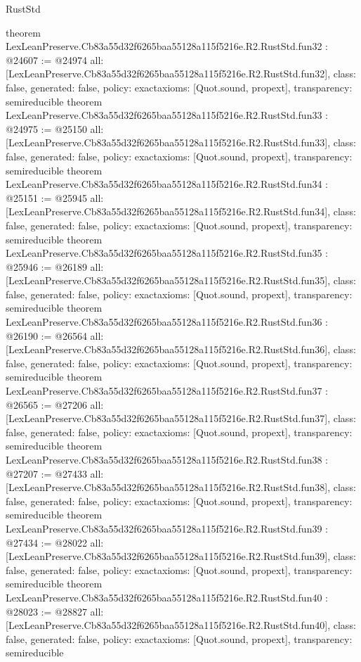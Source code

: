 \begin{lexlean}{RustStd}
\begin{coremodule}
{}
theorem LexLeanPreserve.Cb83a55d32f6265baa55128a115f5216e.R2.RustStd.fun32 : @24607 := @24974 {
  all: [LexLeanPreserve.Cb83a55d32f6265baa55128a115f5216e.R2.RustStd.fun32],
  class: false,
  generated: false,
  policy: exact{axioms: [Quot.sound, propext]},
  transparency: semireducible
}
theorem LexLeanPreserve.Cb83a55d32f6265baa55128a115f5216e.R2.RustStd.fun33 : @24975 := @25150 {
  all: [LexLeanPreserve.Cb83a55d32f6265baa55128a115f5216e.R2.RustStd.fun33],
  class: false,
  generated: false,
  policy: exact{axioms: [Quot.sound, propext]},
  transparency: semireducible
}
theorem LexLeanPreserve.Cb83a55d32f6265baa55128a115f5216e.R2.RustStd.fun34 : @25151 := @25945 {
  all: [LexLeanPreserve.Cb83a55d32f6265baa55128a115f5216e.R2.RustStd.fun34],
  class: false,
  generated: false,
  policy: exact{axioms: [Quot.sound, propext]},
  transparency: semireducible
}
theorem LexLeanPreserve.Cb83a55d32f6265baa55128a115f5216e.R2.RustStd.fun35 : @25946 := @26189 {
  all: [LexLeanPreserve.Cb83a55d32f6265baa55128a115f5216e.R2.RustStd.fun35],
  class: false,
  generated: false,
  policy: exact{axioms: [Quot.sound, propext]},
  transparency: semireducible
}
theorem LexLeanPreserve.Cb83a55d32f6265baa55128a115f5216e.R2.RustStd.fun36 : @26190 := @26564 {
  all: [LexLeanPreserve.Cb83a55d32f6265baa55128a115f5216e.R2.RustStd.fun36],
  class: false,
  generated: false,
  policy: exact{axioms: [Quot.sound, propext]},
  transparency: semireducible
}
theorem LexLeanPreserve.Cb83a55d32f6265baa55128a115f5216e.R2.RustStd.fun37 : @26565 := @27206 {
  all: [LexLeanPreserve.Cb83a55d32f6265baa55128a115f5216e.R2.RustStd.fun37],
  class: false,
  generated: false,
  policy: exact{axioms: [Quot.sound, propext]},
  transparency: semireducible
}
theorem LexLeanPreserve.Cb83a55d32f6265baa55128a115f5216e.R2.RustStd.fun38 : @27207 := @27433 {
  all: [LexLeanPreserve.Cb83a55d32f6265baa55128a115f5216e.R2.RustStd.fun38],
  class: false,
  generated: false,
  policy: exact{axioms: [Quot.sound, propext]},
  transparency: semireducible
}
theorem LexLeanPreserve.Cb83a55d32f6265baa55128a115f5216e.R2.RustStd.fun39 : @27434 := @28022 {
  all: [LexLeanPreserve.Cb83a55d32f6265baa55128a115f5216e.R2.RustStd.fun39],
  class: false,
  generated: false,
  policy: exact{axioms: [Quot.sound, propext]},
  transparency: semireducible
}
theorem LexLeanPreserve.Cb83a55d32f6265baa55128a115f5216e.R2.RustStd.fun40 : @28023 := @28827 {
  all: [LexLeanPreserve.Cb83a55d32f6265baa55128a115f5216e.R2.RustStd.fun40],
  class: false,
  generated: false,
  policy: exact{axioms: [Quot.sound, propext]},
  transparency: semireducible
}
\end{coremodule}
\end{lexlean}
